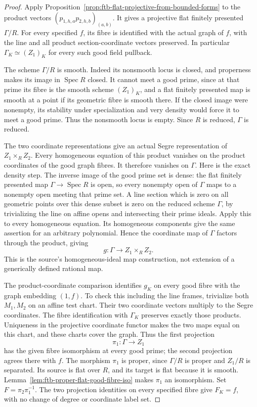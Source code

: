 \begin{proof}
Apply
Proposition~\ref{prop:ftb-flat-projective-from-bounded-forms}
to the product vectors
\((p_{1,h,a}p_{2,h,b})_{(a,b)}\).
It gives a projective flat finitely presented
\(\Gamma/R\).
For every specified \(f\), its fibre is identified with
the actual graph of \(f\), with the line and all product
section-coordinate vectors preserved.
In particular \(\Gamma_K\simeq(Z_1)_K\) for every such
good field pullback.

The scheme \(\Gamma/R\) is smooth.
Indeed its nonsmooth locus is closed, and properness
makes its image in \(\operatorname{Spec}R\) closed.
It cannot meet a good prime, since at that prime its
fibre is the smooth scheme \((Z_1)_K\), and a flat
finitely presented map is smooth at a point if its
geometric fibre is smooth there.
If the closed image were nonempty, its stability
under specialization and very density would force it
to meet a good prime.
Thus the nonsmooth locus is empty.
Since \(R\) is reduced, \(\Gamma\) is reduced.

The two coordinate representations give an actual
Segre representation of \(Z_1\times_RZ_2\).
Every homogeneous equation of this product vanishes
on the product coordinates of the good graph fibres.
It therefore vanishes on \(\Gamma\).
Here is the exact density step.
The inverse image of the good prime set is dense:
the flat finitely presented map \(\Gamma\to\operatorname{Spec}R\)
is open, so every nonempty open of \(\Gamma\) maps to
a nonempty open meeting that prime set.
A line section which is zero on all geometric points
over this dense subset is zero on the reduced scheme
\(\Gamma\), by trivializing the line on affine opens
and intersecting their prime ideals.
Apply this to every homogeneous equation.
Its homogeneous components give the same assertion
for an arbitrary polynomial.
Hence the coordinate map of \(\Gamma\) factors through
the product, giving
\[
                              g:\Gamma\longrightarrow Z_1\times_RZ_2.
 \tag{G2}\label{eq:ftb-bounded-graph-product-map}
\]
This is the source's homogeneous-ideal map construction,
not extension of a generically defined rational map.

The product-coordinate comparison identifies
\(g_K\) on every good fibre with the graph embedding
\((1,f)\).
To check this including the line frames, trivialize
both \(M_1,M_2\) on an affine test chart.
Their two coordinate vectors multiply to the Segre
coordinates.
The fibre identification with \(\Gamma_K\) preserves
exactly those products.
Uniqueness in the projective coordinate functor makes
the two maps equal on this chart, and these charts
cover the graph.
Thus the first projection
\[
                              \pi_1:\Gamma\longrightarrow Z_1
\]
has the given fibre isomorphism at every good prime;
the second projection agrees there with \(f\).
The morphism \(\pi_1\) is proper, since \(\Gamma/R\)
is proper and \(Z_1/R\) is separated.
Its source is flat over \(R\), and its target is flat
because it is smooth.
Lemma~\ref{lem:ftb-proper-flat-good-fibre-iso} makes
\(\pi_1\) an isomorphism.
Set \(F=\pi_2\pi_1^{-1}\).
The two projection identities on every specified fibre
give \(F_K=f\), with no change of degree or coordinate
label set.
\end{proof}

